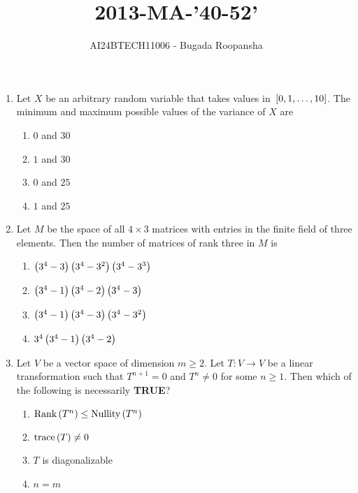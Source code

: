 \documentclass[journal,12pt,twocolumn]{IEEEtran}
\theoremstyle{remark}
\begin{document}

\vspace{3cm}
\title{2013-MA-'40-52'}
\author{AI24BTECH11006 - Bugada Roopansha}
\maketitle

\begin{enumerate}[start=40]
 
    \item Let $X$ be an arbitrary random variable that takes values in ${}\left[0, 1, \dots, 10\right]$. The minimum and maximum possible values of the variance of $X$ are
    \begin{enumerate}
        \item $0$ and $30$
        \item $1$ and $30$
        \item $0$ and $25$
        \item $1$ and $25$
    \end{enumerate}

    \item Let $M$ be the space of all $4 \times 3$ matrices with entries in the finite field of three elements. Then the number of matrices of rank three in $M$ is
    \begin{enumerate}
        \item $\left(3^4 - 3\right) \left(3^{4} - 3^{2}\right) \left(3^{4} - 3^{3}\right)$
        \item $\left(3^4 - 1\right) \left(3^4 - 2\right) \left(3^4 - 3\right)$
        \item $\left(3^4 -1\right) \left(3^4 - 3\right) \left(3^{4} - 3^{2}\right)$
        \item $3^4\left(3^4 - 1\right) \left(3^4 - 2\right)$
    \end{enumerate}

    \item Let $V$ be a vector space of dimension $m \geq 2$. Let $T: V \rightarrow V$ be a linear transformation such that $T^{n+1} = 0$ and $T^{n} \neq 0$ for some $n \geq 1$. Then which of the following is necessarily \textbf{TRUE}?
    \begin{enumerate}
        \item $\text{Rank} \left(T^{n}\right) \leq \text{Nullity} \left(T^{n}\right)$
        \item $\text{trace} \left(T\right) \neq 0$
        \item $T$ is diagonalizable
        \item $n = m$
    \end{enumerate}


\end{enumerate}
\end{document}
